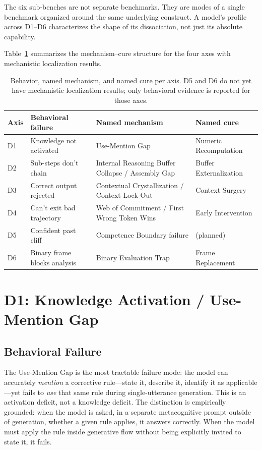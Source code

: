\documentclass[11pt]{article}
\newcommand{\tighttable}{\setlength{\tabcolsep}{4pt}\renewcommand{\arraystretch}{1.05}}
\newcommand{\umg}{Use-Mention Gap}
\newcommand{\Umg}{Use-Mention Gap}
\newcommand{\Irb}{Internal Reasoning Buffer}
\newcommand{\Cc}{Contextual Crystallization}
\newcommand{\Bet}{Binary Evaluation Trap}
\begin{document}
The six sub-benches are not separate benchmarks. They are modes of a
single benchmark organized around the same underlying construct. A
model's profile across D1--D6 characterizes the shape of its
dissociation, not just its absolute capability.

Table~\ref{tab:mech-beh} summarizes the mechanism--cure structure for
the four axes with mechanistic localization results.

\begin{table}[H]
\centering\small\tighttable
\begin{tabular}{p{1.5cm}p{2.4cm}p{2.1cm}p{2.1cm}}
\toprule
\textbf{Axis} & \textbf{Behavioral failure} & \textbf{Named mechanism} & \textbf{Named cure} \\
\midrule
D1 & Knowledge not activated & \Umg{} & Numeric Recomputation \\
D2 & Sub-steps don't chain & \Irb{} Collapse / Assembly Gap & Buffer Externalization \\
D3 & Correct output rejected & \Cc{} / Context Lock-Out & Context Surgery \\
D4 & Can't exit bad trajectory & Web of Commitment / First Wrong Token Wins & Early Intervention \\
D5 & Confident past cliff & Competence Boundary failure & (planned) \\
D6 & Binary frame blocks analysis & \Bet{} & Frame Replacement \\
\bottomrule
\end{tabular}
\caption{Behavior, named mechanism, and named cure per axis. D5 and D6
do not yet have mechanistic localization results; only behavioral evidence
is reported for those axes.}
\label{tab:mech-beh}
\end{table}

\section{D1: Knowledge Activation / \Umg{}}
\label{sec:d1}

\subsection{Behavioral Failure}

The \umg{} is the most tractable failure mode: the model can accurately
\textit{mention} a corrective rule---state it, describe it, identify it
as applicable---yet fails to \textit{use} that same rule during
single-utterance generation. This is an activation deficit, not a
knowledge deficit. The distinction is empirically grounded: when the
model is asked, in a separate metacognitive prompt outside of generation,
whether a given rule applies, it answers correctly. When the model must
apply the rule inside generative flow without being explicitly invited
to state it, it fails.
\end{document}
